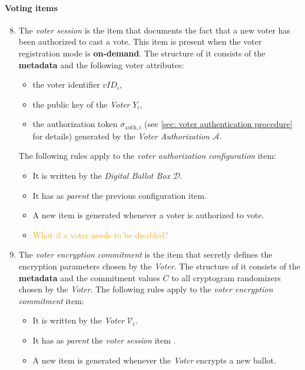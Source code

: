 \paragraph{Voting items}
\begin{enumerate}
    \setcounter{enumi}{7}
    \item
        The \textit{voter session} is the item that documents the fact that a new voter has been authorized to cast a vote. This item is present when the voter registration mode is \textbf{on-demand}. The structure of it consists of the \textbf{metadata} and the following voter attributes:
        \begin{itemize}
            \item the voter identifier $vID_i$,
            \item the public key of the \textit{Voter} $Y_i$,
            \item the authorization token $\sigma_{\mathrm{auth}, i}$ (see \cref{sec: voter authentication procedure} for details) generated by the \textit{Voter Authorization} $\mathcal{A}$.
        \end{itemize}
        The following rules apply to the \textit{voter authorization configuration} item:
        \begin{itemize}
            \item It is written by the \textit{Digital Ballot Box} $\mathcal{D}$.
            \item It has as \textit{parent} the previous configuration item.
            \item A new item is generated whenever a voter is authorized to vote.
            \item \textcolor{orange}{What if a voter needs to be disabled?}
        \end{itemize}
    
    \item 
        The \textit{voter encryption commitment} is the item that secretly defines the encryption parameters chosen by the \textit{Voter}. The structure of it consists of the \textbf{metadata} and the commitment values $C$ to all cryptogram randomizers chosen by the \textit{Voter}. The following rules apply to the \textit{voter encryption commitment} item:
        \begin{itemize} 
            \item It is written by the \textit{Voter} $\mathcal{V}_i$.
            \item It has as \textit{parent} the \textit{voter session} item .
            \item A new item is generated whenever the \textit{Voter} encrypts a new ballot.
        \end{itemize}
    

\end{enumerate}
